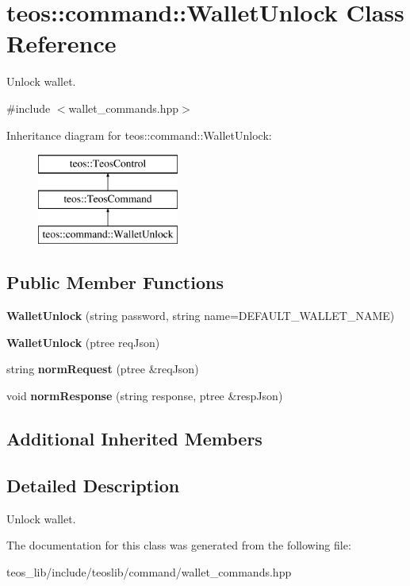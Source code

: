 \hypertarget{classteos_1_1command_1_1_wallet_unlock}{}\section{teos\+:\+:command\+:\+:Wallet\+Unlock Class Reference}
\label{classteos_1_1command_1_1_wallet_unlock}


Unlock wallet.  




{\ttfamily \#include $<$wallet\+\_\+commands.\+hpp$>$}

Inheritance diagram for teos\+:\+:command\+:\+:Wallet\+Unlock\+:\begin{figure}[H]
\begin{center}
\leavevmode
\includegraphics[height=3.000000cm]{classteos_1_1command_1_1_wallet_unlock}
\end{center}
\end{figure}
\subsection*{Public Member Functions}
\begin{DoxyCompactItemize}
\item 
\mbox{\label{classteos_1_1command_1_1_wallet_unlock_a87eecaca05f1c7c96dda5de7c1b35c0e}} 
{\bfseries Wallet\+Unlock} (string password, string name=D\+E\+F\+A\+U\+L\+T\+\_\+\+W\+A\+L\+L\+E\+T\+\_\+\+N\+A\+ME)
\item 
\mbox{\label{classteos_1_1command_1_1_wallet_unlock_a8f5f39f30a96a1c176f2fb5249bdfa0b}} 
{\bfseries Wallet\+Unlock} (ptree req\+Json)
\item 
\mbox{\label{classteos_1_1command_1_1_wallet_unlock_a186153f624725bddb198992c7ffde702}} 
string {\bfseries norm\+Request} (ptree \&req\+Json)
\item 
\mbox{\label{classteos_1_1command_1_1_wallet_unlock_ad8eb4d249f3305fa9beb3b69280e889d}} 
void {\bfseries norm\+Response} (string response, ptree \&resp\+Json)
\end{DoxyCompactItemize}
\subsection*{Additional Inherited Members}


\subsection{Detailed Description}
Unlock wallet. 

The documentation for this class was generated from the following file\+:\begin{DoxyCompactItemize}
\item 
teos\+\_\+lib/include/teoslib/command/wallet\+\_\+commands.\+hpp\end{DoxyCompactItemize}
